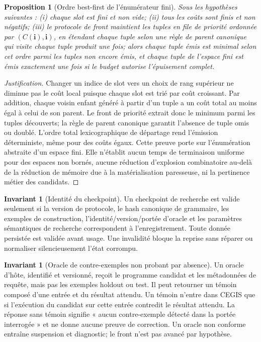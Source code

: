 \documentclass[11pt,a4paper]{article}
\theoremstyle{definition}
\newtheorem{invariant}[definition]{Invariant}
\theoremstyle{plain}
\newtheorem{proposition}[definition]{Proposition}
\theoremstyle{remark}
\begin{document}
\begin{proposition}[Ordre best-first de l'énumérateur fini]
Sous les hypothèses suivantes : (i) chaque slot est fini et non vide; (ii) tous les coûts sont finis et non négatifs; (iii) le protocole de front maintient les tuples en file de priorité ordonnée par \((C(\mathbf{i}),\mathbf{i})\), en étendant chaque tuple selon une règle de parent canonique qui visite chaque tuple produit une fois; alors chaque tuple émis est minimal selon cet ordre parmi les tuples non encore émis, et chaque tuple de l'espace fini est émis exactement une fois si le budget autorise l'épuisement complet.
\end{proposition}

\begin{proof}[Justification]
Changer un indice de slot vers un choix de rang supérieur ne diminue pas le coût local puisque chaque slot est trié par coût croissant. Par addition, chaque voisin enfant généré à partir d'un tuple a un coût total au moins égal à celui de son parent. Le front de priorité extrait donc le minimum parmi les tuples découverts; la règle de parent canonique garantit l'absence de tuple omis ou doublé. L'ordre total lexicographique de départage rend l'émission déterministe, même pour des coûts égaux. Cette preuve porte sur l'énumération abstraite d'un espace fini. Elle n'établit aucun temps de terminaison uniforme pour des espaces non bornés, aucune réduction d'explosion combinatoire au-delà de la réduction de mémoire due à la matérialisation paresseuse, ni la pertinence métier des candidats.
\end{proof}

\begin{invariant}[Identité du checkpoint]
Un checkpoint de recherche est valide seulement si la version de protocole, le hash canonique de grammaire, les exemples de construction, l'identité/version/portée d'oracle et les paramètres sémantiques de recherche correspondent à l'enregistrement. Toute donnée persistée est validée avant usage. Une invalidité bloque la reprise sans réparer ou normaliser silencieusement l'état corrompu.
\end{invariant}

\begin{invariant}[Oracle de contre-exemples non probant par absence]
Un oracle d'hôte, identifié et versionné, reçoit le programme candidat et les métadonnées de requête, mais pas les exemples holdout ou test. Il peut retourner un témoin composé d'une entrée et du résultat attendu. Un témoin n'entre dans CEGIS que si l'exécution du candidat sur cette entrée contredit le résultat attendu. La réponse sans témoin signifie « aucun contre-exemple détecté dans la portée interrogée » et ne donne aucune preuve de correction. Un oracle non conforme entraîne suspension et diagnostic; le front n'est pas avancé par hypothèse.
\end{invariant}
\end{document}
